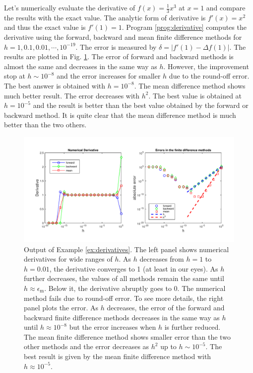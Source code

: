 \bigskip
\begin{example}\label{ex:derivatives}
Let's numerically evaluate the derivative of $f(x)=\displaystyle\frac{1}{3}x^3$ at $x=1$ and compare the results with the exact value.
The analytic form of derivative is $f'(x)=x^2$ and thus the exact value is $f'(1)=1$.  Program \ref{prog:derivative} computes the derivative using the forward, backward and mean finite difference methods for
$h=1, 0.1, 0.01, \cdots, 10^{-19}$.  The error is measured by $\delta = |f'(1)-\Delta f(1)|$.  The results are plotted in Fig.
\ref{fig:derivatives}.  The error of forward and backward methods is almost the same and decreases in the same way as $h$.  However, the improvement stop at $h \sim 10^{-8}$ and the error increases for smaller $h$ due to the round-off error. The best answer is obtained with $h=10^{-8}$. The mean difference method shows much better result.  The error decreases with $h^2$.  The best value is obtained at $h=10^{-5}$ and the result is better than the best value obtained by the forward or backward method.  It is quite clear that the mean difference method is much better than the two others.
\begin{figure}[t]
\centerline{\includegraphics[width=6.0in]{02.derivatives/derivative-plot.pdf}}
\caption{Output of Example \ref{ex:derivatives}.  The left panel shows numerical derivatives for wide ranges of $h$.  As $h$ decreases from $h=1$ to $h=0.01$, the derivative converges to 1 (at least in our eyes). As $h$ further decreases, the values of all methods remain the same until $h \approx \epsilon_\text{m}$.  Below it, the derivative abruptly goes to 0.  The numerical method fails due to round-off error. To see more details, the right panel plots the error. As $h$ decreases, the error of the forward and backward finite difference methods decreases in the same way as $h$ until $h \approx 10^{-8}$ but the error increases when $h$ is further reduced.  The mean finite difference method shows smaller error than the two other methods and the error decreases as $h^2$ up to $h \sim 10^{-5}$.  The best result is given by the mean finite difference method with $h \approx 10^{-5}$.}
\label{fig:derivatives}
\end{figure}
\end{example}
\bigskip

